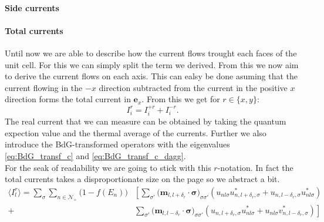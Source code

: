 \documentclass[../main.tex]{subfile}
\begin{document}
\paragraph{Side currents}


\paragraph{Total currents}
Until now we are able to describe how the current flows trought each faces of the unit cell. For this we can simply split the term we derived.
From this we now aim to derive the current flows on each axis.
This can ealsy be done asuming that the current flowing in the $-x$ direction subtracted from the current in the positive $x$ direction forms the total current in $\bm{e}_x$.
From this we get for $r\in\{x,y\}$:
\[
    I_{i}^{r} = I_{i}^{+r} + I_{i}^{-r}.
\]
The real current that we can measure can be obtained by taking the quantum expection value and the thermal average of the currents. Further we also introduce the 
BdG-transformed operators with the eigenvalues \ref{eq:BdG_transf_c} and \ref{eq:BdG_transf_c_dagg}. \\

For the seak of readability we are going to stick with this $r$-notation. In fact the total currents takes a disproportionate size on the page so we abstract a bit.
\begin{equation*}
    \begin{aligned}
    \langle I_l^r\rangle = \sum_{\sigma}\sum_{n\in\mathcal{N}_+} \bigl(1-f(E_n)) 
    &\left[ \sum _{\sigma'}\bigl(\bm{m}_{l,l+\delta_r}\cdot\bm{\sigma}\bigr)_{\sigma\sigma'} \left(u_{nl\sigma} u_{n,l+\delta_r,\sigma}^{\ast}  + u_{n,l-\delta_r,\sigma}u_{nl\sigma}^{\ast}\right)\right.\\
    +&\left.\sum _{\sigma'}\bigl(\bm{m}_{l,l-\delta_r}\cdot\bm{\sigma}\bigr)_{\sigma\sigma'} \left(u_{n,l+\delta_r,\sigma} u_{nl\sigma}^{\ast} + u_{nl\sigma}v_{n,l-\delta_r,\sigma}^{\ast}\right)\right]
    \end{aligned}
\end{equation*}
\end{document}
